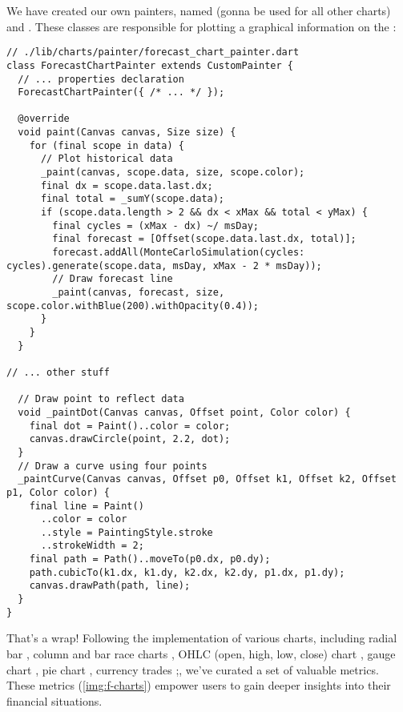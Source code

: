 \noindent We have created our own painters, named  (gonna be used for all other charts) and 
. These classes are responsible for plotting a graphical information on the :

\begin{lstlisting}
// ./lib/charts/painter/forecast_chart_painter.dart
class ForecastChartPainter extends CustomPainter {
  // ... properties declaration
  ForecastChartPainter({ /* ... */ });

  @override
  void paint(Canvas canvas, Size size) {
    for (final scope in data) {
      // Plot historical data
      _paint(canvas, scope.data, size, scope.color);
      final dx = scope.data.last.dx;
      final total = _sumY(scope.data);
      if (scope.data.length > 2 && dx < xMax && total < yMax) {
        final cycles = (xMax - dx) ~/ msDay;
        final forecast = [Offset(scope.data.last.dx, total)];
        forecast.addAll(MonteCarloSimulation(cycles: cycles).generate(scope.data, msDay, xMax - 2 * msDay));
        // Draw forecast line
        _paint(canvas, forecast, size, scope.color.withBlue(200).withOpacity(0.4));
      }
    }
  }

// ... other stuff

  // Draw point to reflect data
  void _paintDot(Canvas canvas, Offset point, Color color) {
    final dot = Paint()..color = color;
    canvas.drawCircle(point, 2.2, dot);
  }
  // Draw a curve using four points
  _paintCurve(Canvas canvas, Offset p0, Offset k1, Offset k2, Offset p1, Color color) {
    final line = Paint()
      ..color = color
      ..style = PaintingStyle.stroke
      ..strokeWidth = 2;
    final path = Path()..moveTo(p0.dx, p0.dy);
    path.cubicTo(k1.dx, k1.dy, k2.dx, k2.dy, p1.dx, p1.dy);
    canvas.drawPath(path, line);
  }
}
\end{lstlisting}

\noindent That's a wrap! Following the implementation of various charts, including radial bar , column 
and bar race charts , OHLC (open, high, low, close) chart , gauge chart  
, pie chart , currency trades ;, we've curated a set of valuable metrics. 
These metrics (\cref{img:f-charts}) empower users to gain deeper insights into their financial situations.

